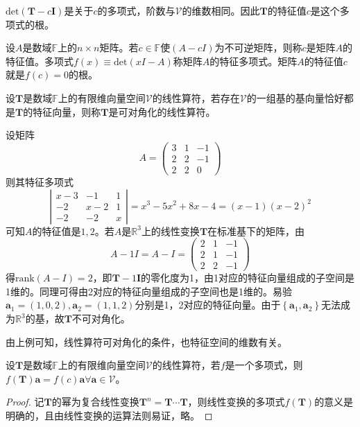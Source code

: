 \documentclass[main.tex]{subfiles}
\begin{document}
$\mathrm{det}\left(\mathbf{T}-c\mathbf{I}\right)$是关于$c$的多项式，阶数与$\mathcal{V}$的维数相同。因此$\mathbf{T}$的特征值$c$是这个多项式的根。

\begin{definition}
设$A$是数域$\mathbb{F}$上的$n\times n$矩阵。若$c\in\mathbb{F}$使$\left(A-cI\right)$为不可逆矩阵，则称$c$是矩阵$A$的特征值。多项式$f\left(x\right)\equiv\mathrm{det}\left(xI-A\right)$称矩阵$A$的特征多项式。矩阵$A$的特征值$c$就是$f\left(c\right)=0$的根。
\end{definition}

\begin{definition}[可对角化线性算符]
设$\mathbf{T}$是数域$\mathbb{F}$上的有限维向量空间$\mathcal{V}$的线性算符，若存在$\mathcal{V}$的一组基的基向量恰好都是$\mathbf{T}$的特征向量，则称$\mathbf{T}$是可对角化的线性算符。
\end{definition}

\begin{example}
设矩阵
\[A=\left(\begin{array}{ccc}3&1&-1\\2&2&-1\\2&2&0\end{array}\right)\]
则其特征多项式
\[\left|\begin{array}{ccc}x-3&-1&1\\-2&x-2&1\\-2&-2&x\end{array}\right|=x^3-5x^2+8x-4=\left(x-1\right)\left(x-2\right)^2\]
可知$A$的特征值是$1,2$。若$A$是$\mathbb{R}^3$上的线性变换$\mathbf{T}$在标准基下的矩阵，由
\[A-1I=A-I=\left(\begin{array}{ccc}2&1&-1\\2&1&-1\\2&2&-1\end{array}\right)\]
得$\mathrm{rank}\left(A-I\right)=2$，即$\mathbf{T}-1\mathbf{I}$的零化度为1，由1对应的特征向量组成的子空间是1维的。同理可得由2对应的特征向量组成的子空间也是1维的。易验$\mathbf{a}_1=\left(1,0,2\right),\mathbf{a}_2=\left(1,1,2\right)$分别是1，2对应的特征向量。由于$\left\{\mathbf{a}_1,\mathbf{a}_2\right\}$无法成为$\mathbb{R}^3$的基，故$\mathbf{T}$不可对角化。
\end{example}

由上例可知，线性算符可对角化的条件，也特征空间的维数有关。

\begin{lemma}
设$\mathbf{T}$是数域$\mathbb{F}$上的有限维向量空间$\mathcal{V}$的线性算符，若$f$是一个多项式，则$f\left(\mathbf{T}\right)\mathbf{a}=f\left(c\right)\mathbf{a}\forall\mathbf{a}\in\mathcal{V}$。
\end{lemma}
\begin{proof}
记$\mathbf{T}$的幂为复合线性变换$\mathbf{T}^n=\mathbf{T}\cdots\mathbf{T}$，则线性变换的多项式$f\left(\mathbf{T}\right)$的意义是明确的，且由线性变换的运算法则易证，略。
\end{proof}
\end{document}
